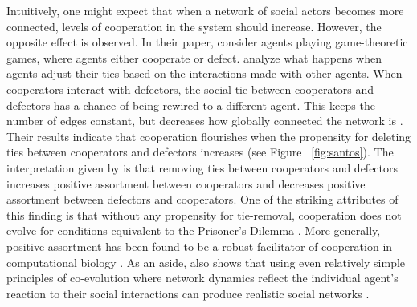 \documentclass[11pt]{article}
\begin{document}
\noindent Intuitively, one might expect that when a network of social actors becomes more connected, levels of cooperation in the system should increase. However, the opposite effect is observed. In their paper,  consider agents playing game-theoretic games, where agents either cooperate or defect. 
 analyze what happens when agents adjust their ties based on the interactions made with other agents. When cooperators interact with defectors, the social tie between cooperators and defectors has a chance of being rewired to a different agent. This keeps the number of edges constant, but decreases how globally connected the network is \cite{santos_cooperation_2006}. Their results indicate that cooperation flourishes when the propensity for deleting ties between cooperators and defectors increases (see Figure ~\ref{fig:santos}). The interpretation given by  is that removing ties between cooperators and defectors increases positive assortment between cooperators and decreases positive assortment between defectors and cooperators. One of the striking attributes of this finding is that without any propensity for tie-removal, cooperation does not evolve for conditions equivalent to the Prisoner’s Dilemma \cite{santos_cooperation_2006}. More generally, positive assortment has been found to be a robust facilitator of cooperation in computational biology \cite{boyd_coordinated_2010,dakin_dynamic_2018,melamed_strong_2016,pepper_mechanism_2002}. As an aside,  also shows that using even relatively simple principles of co-evolution where network dynamics reflect the individual agent's reaction to their social interactions can produce realistic social networks \cite{santos_cooperation_2006}. 
\end{document}
